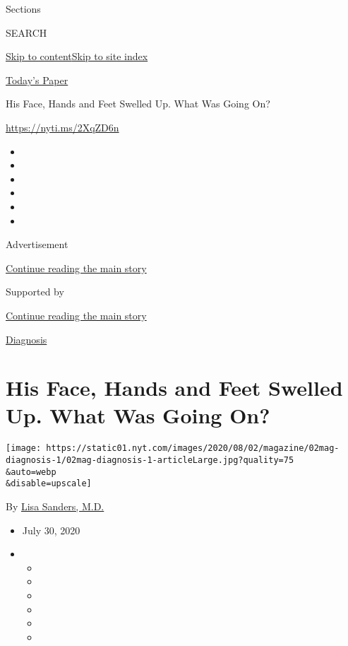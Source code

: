 Sections

SEARCH

\protect\hyperlink{site-content}{Skip to
content}\protect\hyperlink{site-index}{Skip to site index}

\href{https://myaccount.nytimes.com/auth/login?response_type=cookie\&client_id=vi}{}

\href{https://www.nytimes.com/section/todayspaper}{Today's Paper}

His Face, Hands and Feet Swelled Up. What Was Going On?

\url{https://nyti.ms/2XqZD6n}

\begin{itemize}
\item
\item
\item
\item
\item
\item
\end{itemize}

Advertisement

\protect\hyperlink{after-top}{Continue reading the main story}

Supported by

\protect\hyperlink{after-sponsor}{Continue reading the main story}

\href{/column/diagnosis}{Diagnosis}

\hypertarget{his-face-hands-and-feet-swelled-up-what-was-going-on}{%
\section{His Face, Hands and Feet Swelled Up. What Was Going
On?}\label{his-face-hands-and-feet-swelled-up-what-was-going-on}}

\texttt{[image: https://static01.nyt.com/images/2020/08/02/magazine/02mag-diagnosis-1/02mag-diagnosis-1-articleLarge.jpg?quality=75\\\&auto=webp\\\&disable=upscale]}

By \href{https://www.nytimes.com/by/lisa-sanders-md}{Lisa Sanders, M.D.}

\begin{itemize}
\item
  July 30, 2020
\item
  \begin{itemize}
  \item
  \item
  \item
  \item
  \item
  \item
  \end{itemize}
\end{itemize}


